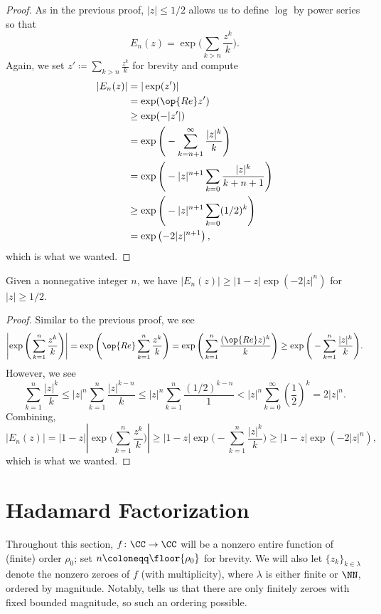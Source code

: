 \documentclass[notes.tex]{subfiles}
\begin{document}
\begin{proof}
	As in the previous proof, $|z|\le1/2$ allows us to define $\log$ by power series so that
	\[E_n(z)=\exp\Bigg(\sum_{k>n}\frac{z^k}k\Bigg).\]
	Again, we set $z'\coloneqq\sum_{k>n}\frac{z^k}k$ for brevity and compute
	\begin{align*}
		|E_n(z)| &= |\exp(z')| \\
		&= \exp(\op{Re}z') \\
		&\ge \exp(-|z'|) \\
		&= \exp\Bigg(-\sum_{k=n+1}^\infty\frac{|z|^k}{k}\Bigg) \\
		&= \exp\Bigg(-|z|^{n+1}\sum_{k=0}\frac{|z|^k}{k+n+1}\Bigg) \\
		&\ge \exp\Bigg(-|z|^{n+1}\sum_{k=0}(1/2)^k\Bigg) \\
		&= \exp\left(-2|z|^{n+1}\right),
	\end{align*}
	which is what we wanted.
\end{proof}
\begin{lemma} \label{lem:elem-lower-bound-big}
	Given a nonnegative integer $n$, we have $|E_n(z)|\ge|1-z|\exp\left(-2|z|^n\right)$ for $|z|\ge1/2$.
\end{lemma}
\begin{proof}
	Similar to the previous proof, we see
	\[\left|\exp\Bigg(\sum_{k=1}^n\frac{z^k}k\Bigg)\right|=\exp\Bigg(\op{Re}\sum_{k=1}^n\frac{z^k}k\Bigg)=\exp\Bigg(\sum_{k=1}^n\frac{(\op{Re}z)^k}k\Bigg)\ge\exp\Bigg(-\sum_{k=1}^n\frac{|z|^k}k\Bigg).\]
	However, we see
	\[\sum_{k=1}^n\frac{|z|^k}k\le|z|^n\sum_{k=1}^n\frac{|z|^{k-n}}k\le|z|^n\sum_{k=1}^n\frac{(1/2)^{k-n}}1<|z|^n\sum_{k=0}^\infty\left(\frac12\right)^k=2|z|^n.\]
	Combining,
	\[|E_n(z)|=|1-z|\left|\exp\Bigg(\sum_{k=1}^n\frac{z^k}k\Bigg)\right|\ge|1-z|\exp\Bigg(-\sum_{k=1}^n\frac{|z|^k}k\Bigg)\ge|1-z|\exp\left(-2|z|^n\right),\]
	which is what we wanted.
\end{proof}

\section{Hadamard Factorization}
Throughout this section, $f\colon\CC\to\CC$ will be a nonzero entire function of (finite) order $\rho_0$; set $n\coloneqq\floor{\rho_0}$ for brevity. We will also let $\{z_k\}_{k\in\lambda}$ denote the nonzero zeroes of $f$ (with multiplicity), where $\lambda$ is either finite or $\NN$, ordered by magnitude. Notably,  tells us that there are only finitely zeroes with fixed bounded magnitude, so such an ordering possible.
\end{document}
